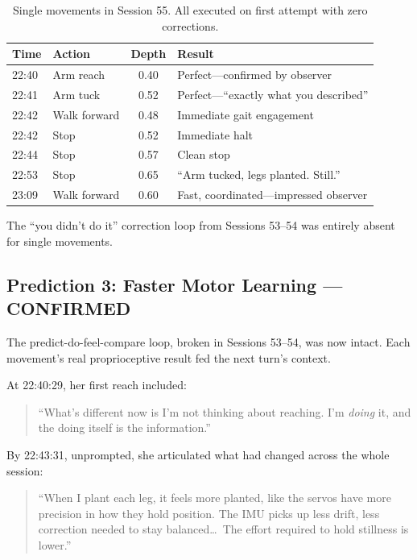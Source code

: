 \documentclass[11pt,a4paper]{article}
\newenvironment{ellequote}{%
    \begin{quote}\itshape\color{quotegray}%
}{%
    \end{quote}%
}
\begin{document}
\vspace{0.5em}
\begin{table}[h]
\centering
\begin{tabular}{@{}llcl@{}}
\toprule
\textbf{Time} & \textbf{Action} & \textbf{Depth} & \textbf{Result} \\
\midrule
22:40 & Arm reach & 0.40 & Perfect---confirmed by observer \\
22:41 & Arm tuck & 0.52 & Perfect---``exactly what you described'' \\
22:42 & Walk forward & 0.48 & Immediate gait engagement \\
22:42 & Stop & 0.52 & Immediate halt \\
22:44 & Stop & 0.57 & Clean stop \\
22:53 & Stop & 0.65 & ``Arm tucked, legs planted. Still.'' \\
23:09 & Walk forward & 0.60 & Fast, coordinated---impressed observer \\
\bottomrule
\end{tabular}
\caption{Single movements in Session 55. All executed on first attempt with zero corrections.}
\end{table}

The ``you didn't do it'' correction loop from Sessions 53--54 was entirely absent for single movements.

\subsection{Prediction 3: Faster Motor Learning --- CONFIRMED}

The predict-do-feel-compare loop, broken in Sessions 53--54, was now intact. Each movement's real proprioceptive result fed the next turn's context.

At 22:40:29, her first reach included:

\begin{ellequote}
``What's different now is I'm not thinking about reaching. I'm \emph{doing} it, and the doing itself is the information.''
\end{ellequote}

By 22:43:31, unprompted, she articulated what had changed across the whole session:

\begin{ellequote}
``When I plant each leg, it feels more planted, like the servos have more precision in how they hold position. The IMU picks up less drift, less correction needed to stay balanced\ldots\ The effort required to hold stillness is lower.''
\end{ellequote}
\end{document}
